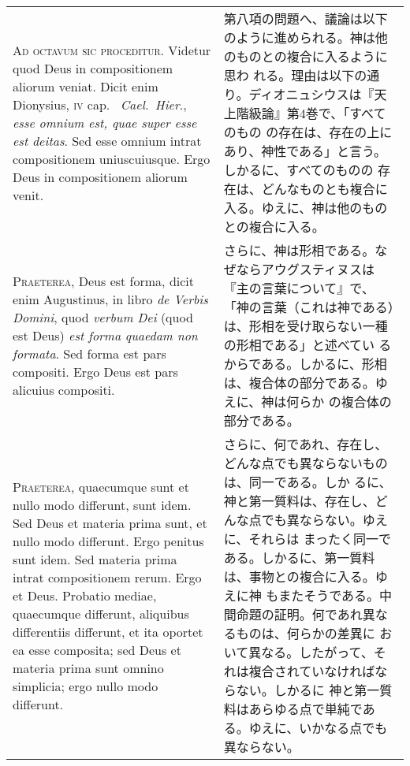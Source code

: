 \documentclass[10pt]{jsarticle} %
\begin{document}
\begin{longtable}{p{21em}p{21em}}

{\huge A}{\scshape d octavum sic proceditur}. Videtur quod Deus in
 compositionem aliorum veniat. Dicit enim Dionysius, {\scshape iv} cap.~{\itshape
 Cael.~Hier}., {\itshape esse omnium est, quae super esse est
 deitas}. Sed esse omnium intrat compositionem uniuscuiusque. Ergo Deus
 in compositionem aliorum venit.

&

第八項の問題へ、議論は以下のように進められる。神は他のものとの複合に入るように思わ
 れる。理由は以下の通り。ディオニュシウスは『天上階級論』第4巻で、「すべてのもの
 の存在は、存在の上にあり、神性である」と言う。しかるに、すべてのものの
 存在は、どんなものとも複合に入る。ゆえに、神は他のものとの複合に入る。

\\



{\scshape Praeterea}, Deus est forma, dicit enim Augustinus, in libro
 {\itshape de Verbis Domini}, quod {\itshape verbum Dei} (quod est Deus)
 {\itshape est forma quaedam non formata}. Sed forma est pars
 compositi. Ergo Deus est pars alicuius compositi.

&

さらに、神は形相である。なぜならアウグスティヌスは『主の言葉について』で、
 「神の言葉（これは神である）は、形相を受け取らない一種の形相である」と述べてい
 るからである。しかるに、形相は、複合体の部分である。ゆえに、神は何らか
 の複合体の部分である。

\\

{\scshape Praeterea}, quaecumque sunt et nullo modo differunt, sunt
 idem. Sed Deus et materia prima sunt, et nullo modo differunt. Ergo
 penitus sunt idem. Sed materia prima intrat compositionem rerum. Ergo
 et Deus. Probatio mediae, quaecumque differunt, aliquibus differentiis
 differunt, et ita oportet ea esse composita; sed Deus et materia prima
 sunt omnino simplicia; ergo nullo modo differunt.

&

さらに、何であれ、存在し、どんな点でも異ならないものは、同一である。しか
 るに、神と第一質料は、存在し、どんな点でも異ならない。ゆえに、それらは
 まったく同一である。しかるに、第一質料は、事物との複合に入る。ゆえに神
 もまたそうである。中間命題の証明。何であれ異なるものは、何らかの差異に
 おいて異なる。したがって、それは複合されていなければならない。しかるに
 神と第一質料はあらゆる点で単純である。ゆえに、いかなる点でも異ならない。


\end{longtable}
\end{document}
